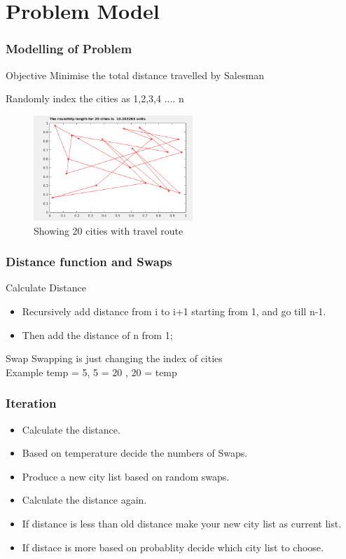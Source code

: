 \documentclass{beamer}
\begin{document}
\section{Problem Model}
\begin{frame}
    \frametitle{Modelling of Problem}
    \begin{block}{Objective}
        Minimise the total distance travelled by Salesman \\
    \end{block}
    Randomly index the cities as 1,2,3,4 .... n
    \begin{figure}[t]
        \includegraphics[width = 6cm]{randomcities}
        \caption{Showing 20 cities with travel route}
        \centering
    \end{figure}
\end{frame}

\begin{frame}
    \frametitle{Distance function and Swaps}
    Calculate Distance
    \begin{itemize}
        \item Recursively add distance from i to i+1 starting from 
            1, and go till n-1.
        \item Then add the distance of n from 1;
    \end{itemize}
    \begin{block}{Swap}
        Swapping is just changing the index of cities\\
        Example \alert{temp = 5, 5 = 20 , 20 = temp}
    \end{block}
\end{frame}

\begin{frame}
    \frametitle{Iteration}
    \begin{itemize}
        \item Calculate the distance.
        \item Based on temperature decide the numbers of Swaps.
        \item Produce a new city list based on random swaps.
        \item Calculate the distance again.
        \item If distance is less than old distance make your new city list as current list.
        \item If distace is more based on probablity decide which city list to choose.
    \end{itemize}
\end{frame}
\end{document}
